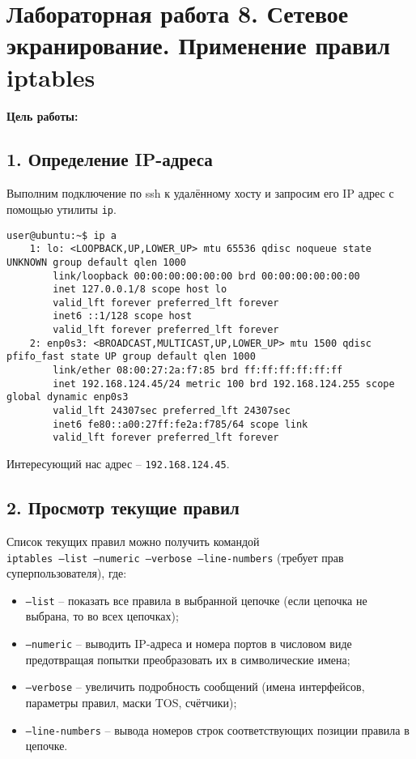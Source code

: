 \chapter*{Лабораторная работа 8. Сетевое экранирование. Применение правил iptables}

\textbf{Цель работы:} 

\section*{1. Определение IP-адреса}

Выполним подключение по ssh к удалённому хосту и запросим его IP адрес с помощью утилиты \texttt{ip}.

\begin{Verbatim}[frame=single,breaklines=true,breakanywhere=true]
    user@ubuntu:~$ ip a
    1: lo: <LOOPBACK,UP,LOWER_UP> mtu 65536 qdisc noqueue state UNKNOWN group default qlen 1000
        link/loopback 00:00:00:00:00:00 brd 00:00:00:00:00:00
        inet 127.0.0.1/8 scope host lo
        valid_lft forever preferred_lft forever
        inet6 ::1/128 scope host 
        valid_lft forever preferred_lft forever
    2: enp0s3: <BROADCAST,MULTICAST,UP,LOWER_UP> mtu 1500 qdisc pfifo_fast state UP group default qlen 1000
        link/ether 08:00:27:2a:f7:85 brd ff:ff:ff:ff:ff:ff
        inet 192.168.124.45/24 metric 100 brd 192.168.124.255 scope global dynamic enp0s3
        valid_lft 24307sec preferred_lft 24307sec
        inet6 fe80::a00:27ff:fe2a:f785/64 scope link 
        valid_lft forever preferred_lft forever
\end{Verbatim}

Интересующий нас адрес -- \texttt{192.168.124.45}.

\section*{2. Просмотр текущие правил}

Список текущих правил можно получить командой\\\texttt{iptables --list --numeric --verbose --line-numbers} (требует прав суперпользователя), где:

\begin{itemize}
    \item \texttt{--list} -- показать все правила в выбранной цепочке (если цепочка не выбрана, то во всех цепочках);
    \item \texttt{--numeric} -- выводить IP-адреса и номера портов в числовом виде предотвращая попытки преобразовать их в символические имена;
    \item \texttt{--verbose} -- увеличить подробность сообщений (имена интерфейсов, параметры правил, маски TOS, счётчики);
    \item \texttt{--line-numbers} -- вывода номеров строк соответствующих позиции правила в цепочке.
\end{itemize}

